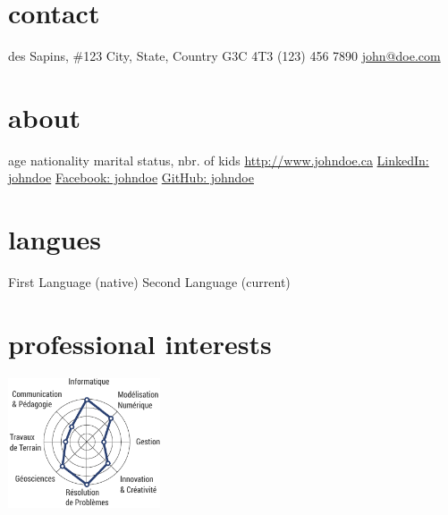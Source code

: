 \documentclass[print]{friggos-cv} %
\begin{document}


\begin{aside} %
	\section{contact}%
	    \vspace{5pt}
		\home{} des Sapins, \#123
		\hspace{0.43cm}City, State, Country
		\hspace{0.43cm}G3C 4T3\vspace{5pt}
		\phoneb \space (123) 456 7890
		\href{}{\mail\space john@doe.com}
		\vspace{10pt}%
	\section{about}%
		\vspace{5pt}
		age
		nationality
		 marital status, nbr. of kids%
		\vspace{5pt}
		\href{}{\globe\hspace{0.1cm} http://www.johndoe.ca}
		\href{}{\linkedin\hspace{0.1cm} LinkedIn: johndoe}
		\href{}{\facebook\hspace{0.1cm} Facebook: johndoe}
		\href{}{\github\hspace{0.1cm} GitHub: johndoe}
		\vspace{10pt}%
	\section{langues}%
		\vspace{5pt}
		First Language (native)
		Second Language (current)
		\vspace{10pt}%
	\section{professional interests}%
		\vspace{10pt}
		\includegraphics[width=4.5cm]{prof_interests_graph}
		\vspace{5pt}%

\end{aside}
\end{document}
